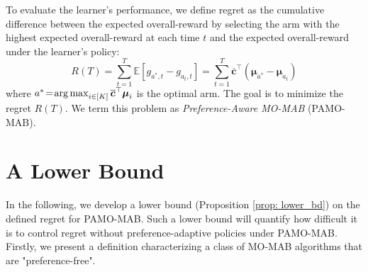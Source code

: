 To evaluate the learner’s performance, we define regret as the cumulative difference between the expected overall-reward by selecting the arm with the highest expected overall-reward at each time $t$ and the expected overall-reward under the learner’s policy:
\begin{equation}
\textstyle
R(T) 
 =
\sum^{T}_{t=1} \mathbb{E}[g_{a^{*}, t} - g_{a_t, t}]  =
\sum^{T}_{t=1} \boldsymbol{\overline{c}}^{\top} (\boldsymbol{\mu}_{a^*} - \boldsymbol{\mu}_{a_t} )
\end{equation}
where $a^{*} \!=\! \operatorname*{arg\,max}_{i \in [K]} \boldsymbol{\overline{c}}^{\top} \boldsymbol{\mu}_{i}$ is the optimal arm.
The goal is to minimize the regret $R(T)$.
We term this problem as \emph{Preference-Aware MO-MAB} (PAMO-MAB).





\section{A Lower Bound}
\label{sec:lower_bd}
In the following, we develop a lower bound (Proposition \ref{prop: lower_bd}) on the defined regret for PAMO-MAB.
Such a lower bound will quantify how difficult it is to control regret without preference-adaptive policies under PAMO-MAB. 
Firstly, we present a definition characterizing a class of MO-MAB algorithms that are "preference-free".


